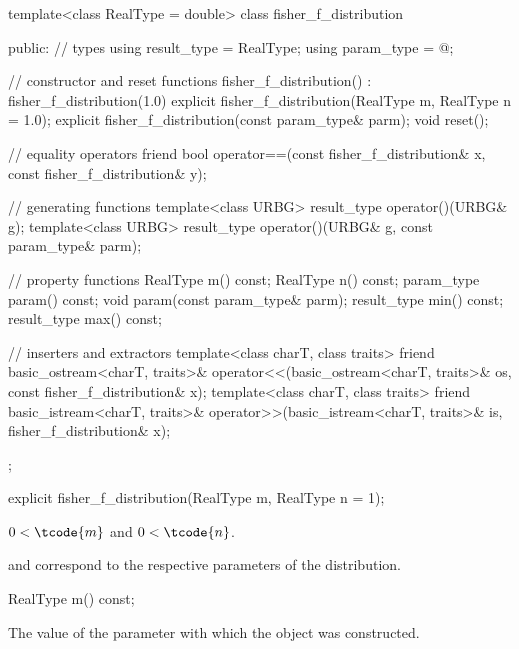 %
%
\begin{codeblock}
template<class RealType = double>
  class fisher_f_distribution {
  public:
    // types
    using result_type = RealType;
    using param_type  = @\unspec@;

    // constructor and reset functions
    fisher_f_distribution() : fisher_f_distribution(1.0) {}
    explicit fisher_f_distribution(RealType m, RealType n = 1.0);
    explicit fisher_f_distribution(const param_type& parm);
    void reset();

    // equality operators
    friend bool operator==(const fisher_f_distribution& x, const fisher_f_distribution& y);

    // generating functions
    template<class URBG>
      result_type operator()(URBG& g);
    template<class URBG>
      result_type operator()(URBG& g, const param_type& parm);

    // property functions
    RealType m() const;
    RealType n() const;
    param_type param() const;
    void param(const param_type& parm);
    result_type min() const;
    result_type max() const;

    // inserters and extractors
    template<class charT, class traits>
      friend basic_ostream<charT, traits>&
        operator<<(basic_ostream<charT, traits>& os, const fisher_f_distribution& x);
    template<class charT, class traits>
      friend basic_istream<charT, traits>&
        operator>>(basic_istream<charT, traits>& is, fisher_f_distribution& x);
  };
\end{codeblock}

%
\begin{itemdecl}
explicit fisher_f_distribution(RealType m, RealType n = 1);
\end{itemdecl}

\begin{itemdescr}
\pnum
\expects
$0 < \tcode{m}$ and $0 < \tcode{n}$.

\pnum
\remarks
{} and 
correspond to the respective parameters of the distribution.
\end{itemdescr}

%
\begin{itemdecl}
RealType m() const;
\end{itemdecl}

\begin{itemdescr}
\pnum
\returns
The value of the  parameter
 with which the object was constructed.
\end{itemdescr}

